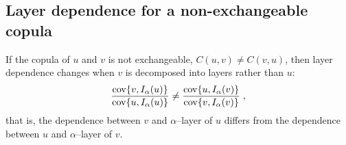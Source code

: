 \documentclass[authoryear]{elsarticle}
\newcommand{\cov}{{\rm cov}}
\newcommand{\E}{{\mathrm E}}
\newcommand{\de}{\mathrm{d}}
\newcommand{\eref}[1]{(\ref{#1})}
\begin{document}

\subsection{Layer dependence for a non-exchangeable copula}

If the copula of $u$ and $v$ is not exchangeable, $C(u,v)\neq C(v,u)$, then layer dependence changes when $v$ is decomposed into layers rather than $u$:
$$
\frac{\cov\{v,I_\alpha(u)\}}{\cov\{u,I_\alpha(u)\}}
\neq \frac{\cov\{u,I_\alpha(v)\}}{\cov\{v,I_\alpha(v)\}}  \;,
$$
that is, the dependence between $v$ and $\alpha$--layer of $u$ differs from the dependence between $u$ and $\alpha$--layer of $v$.
\end{document}
